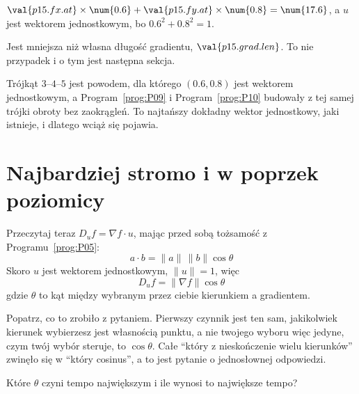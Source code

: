 \begin{fr}
\begin{ansblock}
$\val{p15.fx.at} \times \num{0.6} + \val{p15.fy.at} \times \num{0.8} =
\num{17.6}$, a $u$ jest wektorem jednostkowym, bo
$\num{0.6}^{2} + \num{0.8}^{2} = 1$.
\end{ansblock}


Jest mniejsza niż własna długość gradientu, $\val{p15.grad.len}$. To nie
przypadek i o tym jest następna sekcja.

\begin{note}
Trójkąt $3$--$4$--$5$ jest powodem, dla którego $(\num{0.6}, \num{0.8})$ jest
wektorem jednostkowym, a Program~\ref{prog:P09} i Program~\ref{prog:P10}
budowały z tej samej trójki obroty bez zaokrągleń. To najtańszy dokładny
wektor jednostkowy, jaki istnieje, i dlatego wciąż się pojawia.
\end{note}
\end{fr}

\section{Najbardziej stromo i w poprzek poziomicy}
\label{sec:P15-steepest}

\begin{fr}
Przeczytaj teraz $D_u f = \nabla f \cdot u$, mając przed sobą tożsamość z
Programu~\ref{prog:P05}:
\[ a \cdot b = \lVert a \rVert \, \lVert b \rVert \cos\theta \]
Skoro $u$ jest wektorem jednostkowym, $\lVert u \rVert = 1$, więc
\[ D_u f = \lVert \nabla f \rVert \cos\theta \]
gdzie $\theta$ to kąt między wybranym przez ciebie kierunkiem a gradientem.

Popatrz, co to zrobiło z pytaniem. Pierwszy czynnik jest ten sam, jakikolwiek
kierunek wybierzesz \dash{} jest własnością punktu, a nie twojego wyboru
\dash{} więc jedyne, czym twój wybór steruje, to $\cos\theta$. Całe
\enquote{który z nieskończenie wielu kierunków} zwinęło się w
\enquote{który cosinus}, a to jest pytanie o jednosłownej odpowiedzi.

Które $\theta$ czyni tempo największym i ile wynosi to największe tempo?
\dotline
\nextframe
\end{fr}

